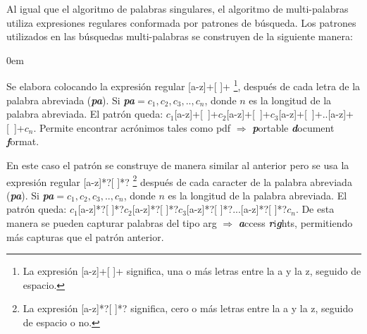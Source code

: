 Al igual que el algoritmo de palabras singulares, el algoritmo de multi-palabras utiliza expresiones regulares conformada por patrones de búsqueda. Los patrones utilizados en las búsquedas multi-palabras se construyen de la siguiente manera:





\begin{description}
\itemsep0em%
\item[Patrón acrónimo:] Se elabora colocando la expresión regular [a-z]+[ ]+ \footnote[1]{La expresión [a-z]+[ ]+ significa, una o más letras entre la a y la z, seguido de espacio.}, después de cada letra de la palabra abreviada (\textit{\textbf{pa}}). Si \textit{\textbf{pa}}$=c_{1},c_{2},c_{3},..,c_{n}$, donde $n$ es la longitud de la palabra abreviada. El patrón queda: \mbox{$c_{1}$[a-z]+[ ]+$c_{2}$[a-z]+[ ]+$c_{3}$[a-z]+[ ]+..[a-z]+[ ]+$c_{n}$}. Permite encontrar acrónimos tales como \textsf{pdf} $\Rightarrow$ \textbf{\textit{p}}ortable \textbf{\textit{d}}ocument \textbf{\textit{f}}ormat.

\item[Patrón de Combinación de Palabras:] En este caso el patrón se construye de manera similar al anterior pero se usa la expresión regular [a-z]*?[ ]*? \footnote[2]{La expresión [a-z]*?[ ]*? significa, cero o más letras entre la a y la z, seguido de espacio o no.} después de cada caracter de la palabra abreviada (\textit{\textbf{pa}}). Si \textit{\textbf{pa}}$=c_{1},c_{2},c_{3},..,c_{n}$, donde $n$ es la longitud de la palabra abreviada. El patrón queda: $c_{1}$[a-z]*?[ ]*?$c_{2}$[a-z]*?[ ]*?$c_{3}$[a-z]*?[ ]*?...[a-z]*?[ ]*?$c_{n}$. De esta manera se pueden capturar palabras del tipo \textsf{arg} $\Rightarrow$ \textbf{\textit{a}}ccess \textbf{\textit{r}}i\textbf{\textit{g}}hts, permitiendo más capturas que el patrón anterior.
\end{description}


